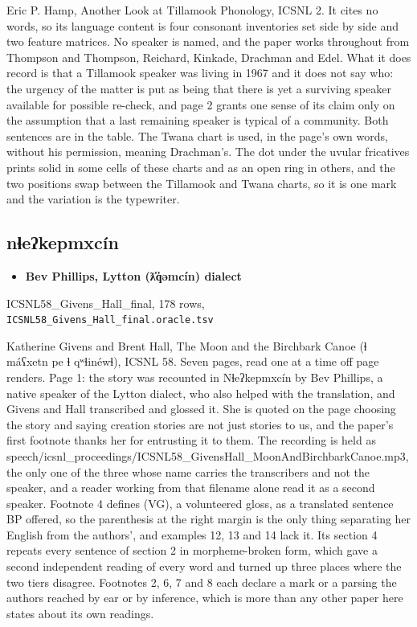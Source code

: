 Eric P. Hamp, Another Look at Tillamook Phonology, ICSNL 2. It cites no words, so its language content is four consonant inventories set side by side and two feature matrices. No speaker is named, and the paper works throughout from Thompson and Thompson, Reichard, Kinkade, Drachman and Edel. What it does record is that a Tillamook speaker was living in 1967 and it does not say who: the urgency of the matter is put as being that there is yet a surviving speaker available for possible re-check, and page 2 grants one sense of its claim only on the assumption that a last remaining speaker is typical of a community. Both sentences are in the table. The Twana chart is used, in the page's own words, without his permission, meaning Drachman's. The dot under the uvular fricatives prints solid in some cells of these charts and as an open ring in others, and the two positions swap between the Tillamook and Twana charts, so it is one mark and the variation is the typewriter.

\subsection{nɬeʔkepmxcín}

\begin{itemize}
\item \textbf{Bev Phillips, Lytton (ƛ̓q̓əmcín) dialect}
\end{itemize}

ICSNL58\_Givens\_Hall\_final, 178 rows, \texttt{ICSNL58\_\allowbreak{}Givens\_\allowbreak{}Hall\_\allowbreak{}final.\allowbreak{}oracle.\allowbreak{}tsv}

Katherine Givens and Brent Hall, The Moon and the Birchbark Canoe (ɬ máʕxetn pe ɬ qʷɬinéwɬ), ICSNL 58. Seven pages, read one at a time off page renders. Page 1: the story was recounted in Nɬeʔkepmxcín by Bev Phillips, a native speaker of the Lytton dialect, who also helped with the translation, and Givens and Hall transcribed and glossed it. She is quoted on the page choosing the story and saying creation stories are not just stories to us, and the paper's first footnote thanks her for entrusting it to them. The recording is held as speech/icsnl\_proceedings/ICSNL58\_GivensHall\_MoonAndBirchbarkCanoe.mp3, the only one of the three whose name carries the transcribers and not the speaker, and a reader working from that filename alone read it as a second speaker. Footnote 4 defines (VG), a volunteered gloss, as a translated sentence BP offered, so the parenthesis at the right margin is the only thing separating her English from the authors', and examples 12, 13 and 14 lack it. Its section 4 repeats every sentence of section 2 in morpheme-broken form, which gave a second independent reading of every word and turned up three places where the two tiers disagree. Footnotes 2, 6, 7 and 8 each declare a mark or a parsing the authors reached by ear or by inference, which is more than any other paper here states about its own readings.


